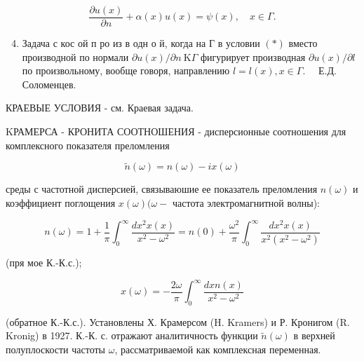 \documentclass[10pt]{article}
\begin{document}
\[

\frac{\partial u(x)}{\partial n}+\alpha(x) u(x)=\psi(x), \quad x \in \Gamma .

\]



\begin{enumerate}

  \setcounter{enumi}{3}

  \item Задача с кос ой п ро из в одн о й, когда на Г в условии $(*)$ вместо производной по нормали $\partial u(x) / \partial n \mathrm{~K} \Gamma$ фигурирует производная $\partial u(x) / \partial l$ по произвольному, вообще говоря, направлению $l=l(x), x \in \Gamma . \quad$ Е.Д. Соломенцев.

\end{enumerate}



КРАЕВЫЕ УСЛОВИЯ - см. Краевая задача.



KРАМЕРСА - КРОНИТА СООТНОШЕНИЯ - дисперсионные соотношения для комплексного показателя преломления



\[

\tilde{n}(\omega)=n(\omega)-i x(\omega)

\]



среды с частотной дисперсией, связываюшие ее показатель преломления $n(\omega)$ и коэффициент поглощения $x(\omega)(\omega-$ частота электромагнитной волны):



\[

n(\omega)=1+\frac{1}{\pi} \int_{0}^{\infty} \frac{d x^{2} x(x)}{x^{2}-\omega^{2}}=n(0)+\frac{\omega^{2}}{\pi} \int_{0}^{\infty} \frac{d x^{2} x(x)}{x^{2}\left(x^{2}-\omega^{2}\right)}

\]



(пря мое К.-К.с.);



\[

x(\omega)=-\frac{2 \omega}{\pi} \int_{0}^{\infty} \frac{d x n(x)}{x^{2}-\omega^{2}}

\]



(обратное К.-К.с.). Установлены Х. Крамерсом (H. Kramers) и Р. Кронигом (R. Kronig) в 1927. К.-К. с. отражают аналитичность функции $\widetilde{n}(\omega)$ в верхней полуплоскости частоты $\omega$, рассматриваемой как комплексная переменная.
\end{document}
